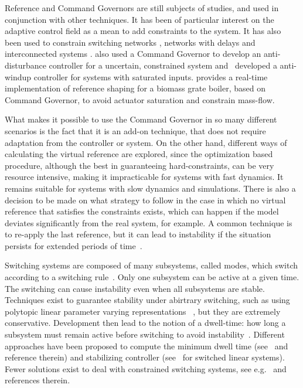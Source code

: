 Reference and Command Governors are still subjects of studies, and used in
conjunction with other techniques. It has been of particular interest on the
adaptive control field
\parencite{arabi.yucelen.ea:command,ristevski.dogan.ea:transient,wilcher.jaramillo.ea:on,dogan.yucelen.ea:improving,gruenwald.yucelen.ea:expanded,makavita.jayasinghe.ea:experimental}
as a mean to add constraints to the system. It has also been used to constrain
switching networks \parencite{ong.djamari.ea:governor}, networks with delays
\parencite{shen.song.ea:constrained} and interconnected systems
\parencite{tedesco.casavola:turn-based}. \textcite{peng.wang.ea:constrained}
also used a Command Governor to develop an anti-disturbance controller for a
uncertain, constrained system
and~\textcite{schwerdtner.bortoff.ea:projection-based} developed a anti-windup
controller for systems with saturated inputs.
\textcite{seeber.golles.ea:reference} provides a real-time implementation of
reference shaping for a biomass grate boiler, based on Command Governor, to
avoid actuator saturation and constrain mass-flow.

What makes it possible to use the Command Governor in so many different
scenarios is the fact that it is an add-on technique, that does not require
adaptation from the controller or system. On the other hand, different ways of
calculating the virtual reference are explored, since the optimization based
procedure, although the best in guaranteeing hard-constraints, can be very
resource intensive, making it impracticable for systems with fast dynamics. It
remains suitable for systems with slow dynamics and simulations. There is also a
decision to be made on what strategy to follow in the case in which no virtual
reference that satisfies the constraints exists, which can happen if the model
deviates significantly from the real system, for example. A common technique is
to re-apply the last reference, but it can lead to instability if the situation
persists for extended periods of
time~\parencite{garone.di-cairano.ea:reference}.

Switching systems are composed of many subsystems, called modes, which switch
according to a switching
rule~\parencite{liberzon:switching,liberzon.morse:basic}. Only one subsystem can
be active at a given time. The switching can cause instability even when all
subsystems are stable. Techniques exist to guarantee stability under abirtrary
switching, such as using polytopic linear parameter varying
representations~\parencite{deaecto.geromel.ea:robust} , but they are extremely
conservative. Development then lead to the notion of a dwell-time: how long a
subsystem must remain active before switching to avoid
instability~\parencite{liberzon.morse:basic}. Different approaches have been
proposed to compute the minimum dwell time
(see~\parencite{chesi.colaneri.ea:computing} and reference therein) and
stabilizing controller (see~\parencite{lin.antsaklis:stability} for switched
linear systems). Fewer solutions exist to deal with constrained switching
systems, see e.g.~\parencite{franzè.lucia.ea:command,lucia.franzè:stabilization}
and references therein.

